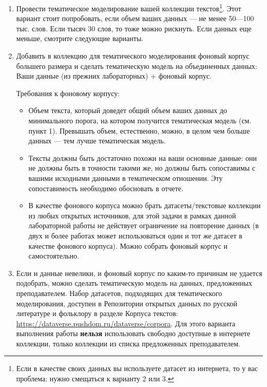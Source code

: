 \documentclass{report}
\begin{document}
\begin{enumerate}
\item[1)] Провести тематическое моделирование вашей коллекции
  текстов\footnote{Если в качестве своих данных вы используете
    датасет из интернета, то у вас проблема: нужно смещаться к
    варианту 2 или 3.}. Этот вариант стоит попробовать, если объем
  ваших данных — не менее 50—100 тыс. слов. Если тысяч 30 слов, то
  тоже можно рискнуть. Если данных еще меньше, смотрите следующие
  варианты.
\item[2)] Добавить в коллекцию для тематического моделирования фоновый
  корпус большего размера и сделать тематическую модель на
  объединенных данных: Ваши данные (из прежних лабораторных) + фоновый
  корпус.

  Требования к фоновому корпусу:
  \begin{itemize}
  \item Объем текста, который доведет общий объем ваших данных до
    минимального порога, на котором получится тематическая модель
    (см. пункт 1). Превышать объем, естественно, можно, в целом чем
    больше данных — тем лучше тематическая модель.
  \item Тексты должны быть достаточно похожи на ваши основные данные:
    они не должны быть в точности такими же, но должны быть
    сопоставимы с вашими исходными данными в тематическом
    отношении. Эту сопоставимость необходимо обосновать в отчете.
  \item В качестве фонового корпуса можно брать датасеты/текстовые
    коллекции из любых открытых источников, для этой задачи в рамках
    данной лабораторной работы не действует ограничение на повторение
    данных (в двух и более работах может использоваться один и тот же
    датасет в качестве фонового корпуса). Можно собрать фоновый корпус
    и самостоятельно.
  \end{itemize}
\item[3)] Если и данные невелики, и фоновый корпус по каким-то
  причинам не удается подобрать, можно сделать тематическую модель на
  данных, предложенных преподавателем. Набор датасетов, подходящих для
  тематического моделирования, доступен в Репозитории открытых данных
  по русской литературе и фольклору в разделе Корпуса текстов:
  \url{https://dataverse.pushdom.ru/dataverse/corpora}. Для этого
  варианта выполнения работы \textbf{нельзя} использовать свободно
  доступные в интернете коллекции, только коллекции из списка
  предложенных преподавателем.
\end{enumerate}
\end{document}
